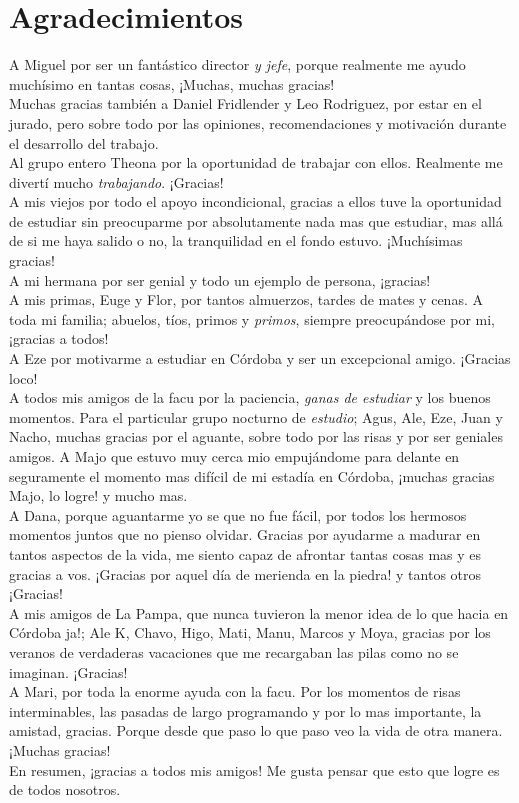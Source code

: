 \chapter*{Agradecimientos}

A Miguel por ser un fantástico director \textit{{\tiny y jefe}}, porque realmente me ayudo
 muchísimo en tantas cosas, ¡Muchas, muchas gracias!\\
Muchas gracias también a Daniel Fridlender y Leo Rodriguez, por estar en el jurado, pero
sobre todo por las opiniones, recomendaciones y motivación durante el desarrollo del trabajo.\\
Al grupo entero Theona por la oportunidad de trabajar con ellos. Realmente me divertí
mucho \textit{trabajando}. ¡Gracias!\\
A mis viejos por todo el apoyo incondicional, gracias a ellos tuve la oportunidad de
estudiar sin preocuparme por absolutamente nada mas que estudiar, mas allá de si me haya
salido o no, la tranquilidad en el fondo estuvo. ¡Muchísimas gracias!\\
A mi hermana por ser genial y todo un ejemplo de persona, ¡gracias!\\
A mis primas, Euge y Flor, por tantos almuerzos, tardes de mates y cenas.
A toda mi familia; abuelos, tíos, primos y \textit{primos}, siempre preocupándose por mi,
¡gracias a todos!\\
A Eze por motivarme a estudiar en Córdoba y ser un excepcional amigo. ¡Gracias loco!\\
A todos mis amigos de la facu por la paciencia, \textit{ganas de estudiar} y los buenos
momentos. Para el particular grupo nocturno de \textit{estudio}; Agus, Ale, Eze, Juan y Nacho,
muchas gracias por el aguante, sobre todo por las risas y por ser geniales amigos. A Majo que
estuvo muy cerca mio empujándome para delante en seguramente el momento mas difícil de mi 
estadía en Córdoba, ¡muchas gracias Majo, lo logre! y mucho mas.\\
A Dana, porque aguantarme yo se que no fue fácil, por todos los hermosos momentos juntos que
no pienso olvidar. Gracias por ayudarme a madurar en tantos aspectos de la vida, me
siento capaz de afrontar tantas cosas mas y es gracias a vos. ¡Gracias por aquel 
día de merienda en la piedra! y tantos otros ¡Gracias!\\
A mis amigos de La Pampa, que nunca tuvieron la menor idea de lo que hacia en Córdoba ja!;
Ale K, Chavo, Higo, Mati, Manu, Marcos y Moya, gracias por los veranos de verdaderas vacaciones
que me recargaban las pilas como no se imaginan. ¡Gracias!\\
A Mari, por toda la enorme ayuda con la facu. Por los momentos de risas interminables, 
las pasadas de largo programando y por lo mas importante, la amistad, gracias. Porque 
desde que paso lo que paso veo la vida de otra manera. ¡Muchas gracias!\\

En resumen, ¡gracias a todos mis amigos! Me gusta pensar que esto que logre es de todos
nosotros.\\
